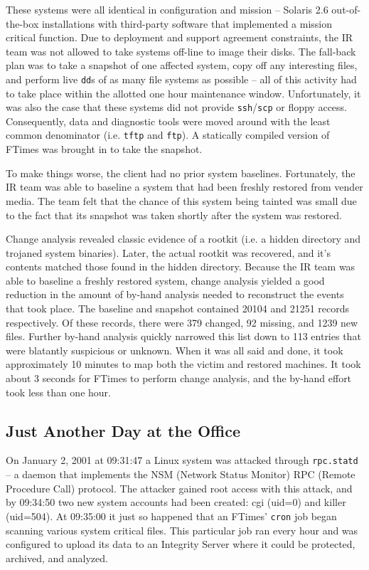 \documentclass[10pt]{article}
\begin{document}
These systems were all identical in configuration and mission --
Solaris 2.6 out-of-the-box installations with third-party software
that implemented a mission critical function.  Due to deployment
and support agreement constraints, the IR team was not allowed to
take systems off-line to image their disks.  The fall-back plan
was to take a snapshot of one affected system, copy off any
interesting files, and perform live \texttt{dd}s of as many file
systems as possible -- all of this activity had to take place within
the allotted one hour maintenance window.  Unfortunately, it was
also the case that these systems did not provide \texttt{ssh}/\texttt{scp}
or floppy access.  Consequently, data and diagnostic tools were
moved around with the least common denominator (i.e.  \texttt{tftp}
and \texttt{ftp}).  A statically compiled version of FTimes was
brought in to take the snapshot.

To make things worse, the client had no prior system baselines.
Fortunately, the IR team was able to baseline a system that had
been freshly restored from vender media.  The team felt that the
chance of this system being tainted was small due to the fact that
its snapshot was taken shortly after the system was restored.

Change analysis revealed classic evidence of a rootkit (i.e. a
hidden directory and trojaned system binaries).  Later, the actual
rootkit was recovered, and it's contents matched those found in
the hidden directory.  Because the IR team was able to baseline a
freshly restored system, change analysis yielded a good reduction
in the amount of by-hand analysis needed to reconstruct the events
that took place.  The baseline and snapshot contained 20104 and
21251 records respectively.  Of these records, there were 379
changed, 92 missing, and 1239 new files.  Further by-hand analysis
quickly narrowed this list down to 113 entries that were blatantly
suspicious or unknown.  When it was all said and done, it took
approximately 10 minutes to map both the victim and restored
machines.  It took about 3 seconds for FTimes to perform change
analysis, and the by-hand effort took less than one hour.

\subsection{Just Another Day at the Office}

On January 2, 2001 at 09:31:47 a Linux system was attacked through
\texttt{rpc.statd} -- a daemon that implements the NSM (Network
Status Monitor) RPC (Remote Procedure Call) protocol.  The attacker
gained root access with this attack, and by 09:34:50 two new system
accounts had been created: cgi (uid=0) and killer (uid=504).  At
09:35:00 it just so happened that an FTimes' \texttt{cron} job
began scanning various system critical files.  This particular job
ran every hour and was configured to upload its data to an Integrity
Server where it could be protected, archived, and analyzed.
\end{document}
